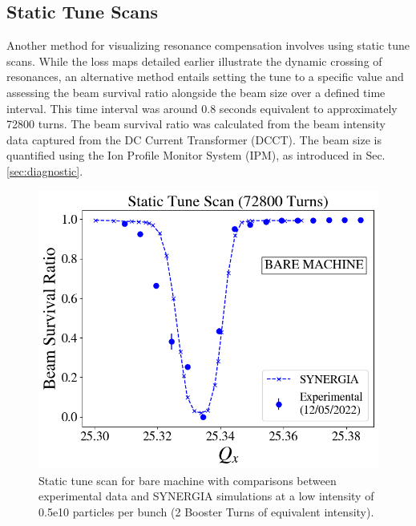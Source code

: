 \subsection{\label{sec:static_low}Static Tune Scans}

Another method for visualizing resonance compensation involves using static tune scans. While the loss maps detailed earlier illustrate the dynamic crossing of resonances, an alternative method entails setting the tune to a specific value and assessing the beam survival ratio alongside the beam size over a defined time interval. This time interval was around 0.8 seconds equivalent to approximately 72800 turns. The beam survival ratio was calculated from the beam intensity data captured from the DC Current Transformer (DCCT). The beam size is quantified using the Ion Profile Monitor System (IPM), as introduced in Sec. \ref{sec:diagnostic}.

\begin{figure}[H]
    \centering
    \includegraphics[width=\columnwidth]{chapter4/static2turns.png}
    \caption{Static tune scan for bare machine with comparisons between experimental data and SYNERGIA simulations at a low intensity of 0.5e10 particles per bunch (2 Booster Turns of equivalent intensity).}
    \label{fig:static2}
\end{figure}

